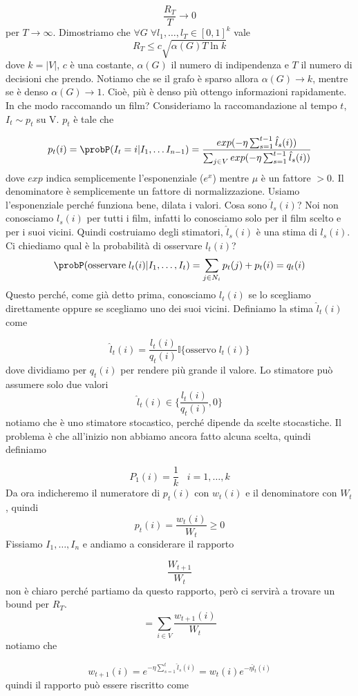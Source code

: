 \documentclass[12pt]{report}
\begin{document}
$$\frac{R_T}{T} \rightarrow 0 $$
per $T \rightarrow \infty$. Dimostriamo che $\forall G \; \forall l_1,\dots,l_T \in [0,1]^k$ vale 
$$R_T \leq c \sqrt{\alpha(G)T \ln{k}}$$
dove $k = |V|$, $c$ è una costante, $\alpha(G)$ il numero di indipendenza e $T$ il numero di decisioni che prendo. Notiamo che se il grafo è sparso allora $\alpha(G) \rightarrow k$, mentre se è denso $\alpha(G) \rightarrow 1$. Cioè, più è denso più ottengo informazioni rapidamente. In che modo raccomando un film? Consideriamo la raccomandazione al tempo $t$, $I_t \sim p_t$ su V. $p_t$ è tale che 

$$p_t(i) = \probP(I_t = i | I_1,\dots I_{n-1}) = \frac{exp(-\eta \sum_{s = 1}^{t-1} \hat l_s(i))}{\sum_{j \in V} exp(-\eta \sum_{s = 1}^{t-1} \hat l_s(i))}$$
dove $exp$ indica semplicemente l'esponenziale ($e^x$) mentre $\mu$  è un fattore $> 0$. Il denominatore è semplicemente un fattore di normalizzazione. Usiamo l'esponenziale perché funziona bene, dilata i valori. Cosa sono $\hat l_s(i)$? Noi non conosciamo $l_s(i)$ per tutti i film, infatti lo conosciamo solo per il film scelto e per i suoi vicini. Quindi costruiamo degli stimatori, $\hat l_s(i)$ è una stima di $l_s(i)$.
Ci chiediamo qual è la probabilità di osservare $l_t(i)$?
$$\probP(\text{osservare} \; l_t(i) | I_1,\dots,I_t) =\sum_{j \in N_i} p_t(j) + p_t(i)  = q_t(i)$$
Questo perché, come già detto prima, conosciamo $l_t(i)$ se lo scegliamo direttamente oppure se scegliamo uno dei suoi vicini. Definiamo la stima $\hat l_t(i)$ come

$$\hat l_t(i) = \frac{l_t(i)}{q_t(i)}\mathds{I}\{\text{osservo} \; l_t(i)\}$$
dove dividiamo per $q_t(i)$ per rendere più grande il valore. Lo stimatore può assumere solo due valori
$$\hat l_t(i) \in \{ \frac{l_t(i)}{q_t(i)},0\}$$
notiamo che è uno stimatore stocastico, perché dipende da scelte stocastiche. Il problema è che all'inizio non abbiamo ancora fatto alcuna scelta, quindi definiamo

$$P_1(i) = \frac{1}{k} \; \; \; i = 1,\dots,k$$
Da ora indicheremo il numeratore di $p_t(i)$ con $w_t(i)$ e il denominatore con $W_t$, quindi
$$p_t(i) = \frac{w_t(i)}{W_t} \geq 0$$
Fissiamo $I_1,\dots,I_n$ e andiamo a considerare il rapporto

$$\frac{W_{t+1}}{W_t}$$
non è chiaro perché partiamo da questo rapporto, però ci servirà a trovare un bound per $R_T$.
$$= \sum_{i \in V} \frac{w_{t+1}(i)}{W_t}$$
notiamo che 

$$w_{t+1}(i) = e^{-\eta \sum_{s = 1}^t\hat l_s(i)} = w_t(i) e^{-\eta \hat l_t(i)} $$
quindi il rapporto può essere riscritto come
\end{document}
